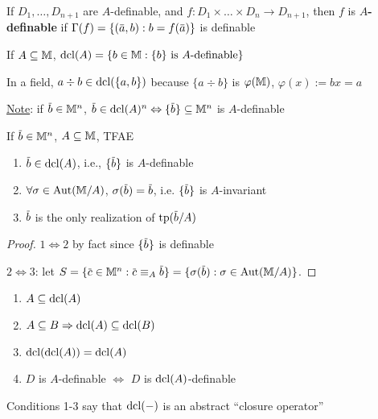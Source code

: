 \documentclass[11pt]{article}
\begin{document}
\begin{definition}[]
If \(D_1,\dots,D_{n+1}\) are \(A\)-definable, and \(f:D_1\times\dots\times D_n\to D_{n+1}\), then \(f\) is
\textbf{\(A\)-definable} if \(\Gamma(f)=\{(\bara,b):b=f(\bara)\}\) is definable
\end{definition}

\begin{definition}[]
If \(A\subseteq\mathbb{M}\), \(\operatorname{dcl}(A)=\{b\in\mathbb{M}:\{b\}\text{ is $A$-definable}\}\)
\end{definition}

\begin{examplle}[]
In a field, \(a\div b\in\operatorname{dcl}(\{a,b\})\) because \(\{a\div b\}\) is \(\varphi(\mathbb{M})\), \(\varphi(x):=bx=a\)
\end{examplle}

\uline{Note}: if \(\barb\in\M^n\), \(\barb\in\dcl(A)^n\Leftrightarrow\{\barb\}\subseteq\M^n\) is \(A\)-definable


\begin{proposition}[]
\label{4.7.5}
If \(\barb\in\M^n\), \(A\subseteq\mathbb{M}\), TFAE
\begin{enumerate}
\item \(\barb\in\dcl(A)\), i.e., \(\{\barb\}\) is \(A\)-definable
\item \(\forall \sigma\in\operatorname{\text{Aut}}(\mathbb{M}/A)\), \(\sigma(\barb)=\barb\), i.e. \(\{\barb\}\) is \(A\)-invariant
\item \(\barb\) is the only realization of \(\tp(\barb/A)\)
\end{enumerate}
\end{proposition}

\begin{proof}
\(1\Leftrightarrow 2\) by fact since \(\{\barb\}\) is definable

\(2\Leftrightarrow 3\): let \(S=\{\barc\in\M^n:\barc\equiv_A\barb\}=\{\sigma(\barb):\sigma\in\Aut(\M/A)\}\).
\end{proof}

\begin{proposition}[]
\label{4.7.6}
\begin{enumerate}
\item \(A\subseteq\operatorname{dcl}(A)\)
\item \(A\subseteq B\Rightarrow\operatorname{dcl}(A)\subseteq\operatorname{dcl}(B)\)
\item \(\operatorname{dcl}(\operatorname{dcl}(A))=\operatorname{dcl}(A)\)
\item \(D\) is \(A\)-definable \(\Leftrightarrow\) \(D\) is \(\operatorname{dcl}(A)\)-definable
\end{enumerate}

Conditions 1-3 say that \(\operatorname{dcl}(-)\) is an abstract ``closure operator''
\end{proposition}
\end{document}
